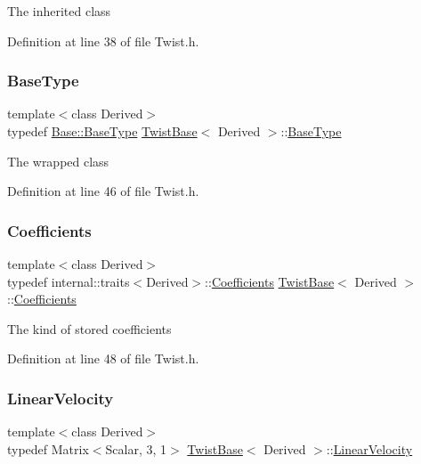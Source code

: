 The inherited class 

Definition at line 38 of file Twist.\+h.

\hypertarget{class_twist_base_a4086aa35326778872a7d0f0bfdfcc0ec}{}\label{class_twist_base_a4086aa35326778872a7d0f0bfdfcc0ec} 
\subsubsection{\texorpdfstring{Base\+Type}{BaseType}}
{\footnotesize\ttfamily template$<$class Derived$>$ \\
typedef \hyperlink{class_lie_algebra_base_3_01_matrix_3_01typename_01internal_1_1traits_3_01_derived_01_4_1_1_scala449314c781550590437697c4dc21a6d4_abb811fe29a9ece0ee6f2239f17fea23f}{Base\+::\+Base\+Type} \hyperlink{class_twist_base}{Twist\+Base}$<$ Derived $>$\+::\hyperlink{class_twist_base_a4086aa35326778872a7d0f0bfdfcc0ec}{Base\+Type}}

The wrapped class 

Definition at line 46 of file Twist.\+h.

\hypertarget{class_twist_base_a773de67da6fe03840b5178517b17e75c}{}\label{class_twist_base_a773de67da6fe03840b5178517b17e75c} 
\subsubsection{\texorpdfstring{Coefficients}{Coefficients}}
{\footnotesize\ttfamily template$<$class Derived$>$ \\
typedef internal\+::traits$<$Derived$>$\+::\hyperlink{class_twist_base_a773de67da6fe03840b5178517b17e75c}{Coefficients} \hyperlink{class_twist_base}{Twist\+Base}$<$ Derived $>$\+::\hyperlink{class_twist_base_a773de67da6fe03840b5178517b17e75c}{Coefficients}}

The kind of stored coefficients 

Definition at line 48 of file Twist.\+h.

\hypertarget{class_twist_base_aeafbc7a3ca37e08812be0af7e680190b}{}\label{class_twist_base_aeafbc7a3ca37e08812be0af7e680190b} 
\subsubsection{\texorpdfstring{Linear\+Velocity}{LinearVelocity}}
{\footnotesize\ttfamily template$<$class Derived$>$ \\
typedef Matrix$<$Scalar, 3, 1$>$ \hyperlink{class_twist_base}{Twist\+Base}$<$ Derived $>$\+::\hyperlink{class_twist_base_aeafbc7a3ca37e08812be0af7e680190b}{Linear\+Velocity}}

